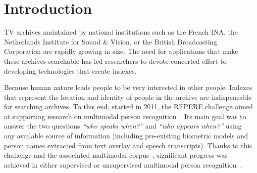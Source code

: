 \section{Introduction}

TV archives maintained by national institutions such as the French INA, the Netherlands Institute for Sound \& Vision, or the British Broadcasting Corporation are rapidly growing in size. The need for applications that make these archives searchable has led researchers to devote concerted effort to developing technologies that create indexes.

Because human nature leads people to be very interested in other people.
Indexes that represent the location and identity of people in the archive are indispensable for searching archives.
%
To this end, started in 2011, the REPERE challenge aimed at supporting research on multimodal person recognition~\cite{BERNARD--SLAM--2013, KAHN--CBMI--2012}. Its main goal was to answer the two questions \emph{``who speaks when?''} and \emph{``who appears when?''} using any available source of information (including pre-existing biometric models and person names extracted from text overlay and speech transcripts). 
%
Thanks to this challenge and the associated multimodal corpus~\cite{GIRAUDEL--LREC--2012}, significant progress was achieved in either supervised or unsupervised multimodal person recognition~\cite{BECHET--INTERSPEECH--2014, BENDRIS--CBMI--2013, BREDIN--ODYSSEY--2014, BREDIN--INTERSPEECH--2013, BREDIN--SLAM--2013, BREDIN--IJMIR--2014, FAVRE--SLAM--2013, GAY--CBMI--2014, POIGNANT--ASLP--2015, POIGNANT--SLAM--2013, POIGNANT--INTERSPEECH--2012, POIGNANT--MTAP--2015, ROUVIER--CBMI--2014}.

